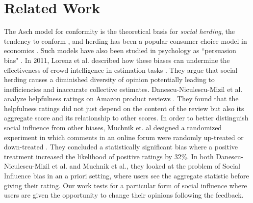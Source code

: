\section{Related Work}



The Asch model for conformity is the theoretical basis for \emph{social herding}, the tendency to conform \cite{banerjee1992simple,bikhchandani2000herd}, and herding has been a popular consumer choice model in economics \cite{burnkrant1975informational,dholakia2002auction,huang2006herding}. 
Such models have also been studied in psychology as ``persuasion bias" \cite{demarzo2003persuasion}.
In 2011, Lorenz et al. described how these biases can undermine the effectiveness of crowd intelligence in estimation tasks \cite{lorenz2011social}. 
They argue that social herding causes a diminished diversity of opinion potentially leading to inefficiencies and inaccurate collective estimates.
Danescu-Niculescu-Mizil et al. analyze helpfulness ratings on Amazon product reviews \cite{danescu2009opinions}.
They found that the helpfulness ratings did not just depend on the content of the review but also its aggregate score and its relationship to other scores.
In order to better distinguish social influence from other biases, Muchnik et. al designed a randomized experiment in which comments in an online forum were randomly up-treated or down-treated \cite{muchnik2013social}.
They concluded a statistically significant bias where a positive treatment increased the likelihood of positive ratings by 32\%. 
In both Danescu-Niculescu-Mizil et al. and Muchnik et al., they looked at the problem of Social Influence bias in an a priori setting, where users see the aggregate statistic before giving their rating.
Our work tests for a particular form of social influence where users are given the opportunity to change their opinions following the feedback. 

